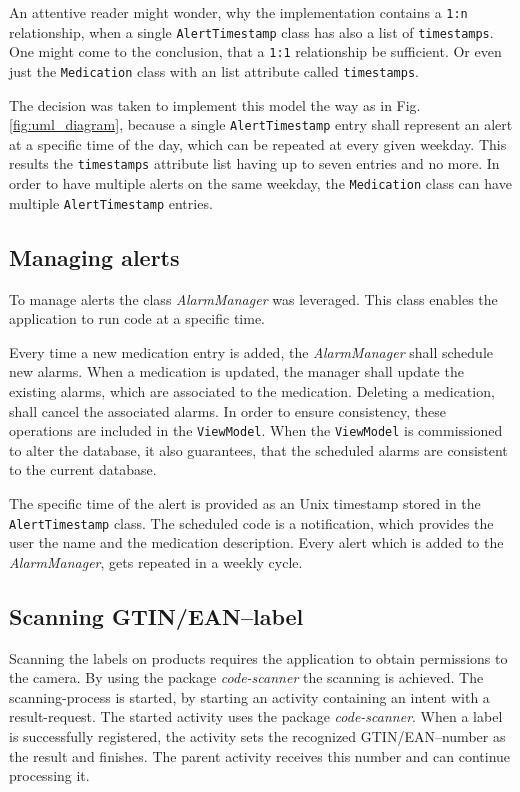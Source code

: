 \documentclass[conference]{IEEEtran}
\begin{document}
An attentive reader might wonder, why the implementation contains a \texttt{1:n} relationship, when a single
\texttt{AlertTimestamp} class has also a list of \texttt{timestamps}. One might come to the conclusion, that a
\texttt{1:1} relationship be sufficient. Or even just the \texttt{Medication} class with an list attribute called
\texttt{timestamps}.

The decision was taken to implement this model the way as in Fig. \ref{fig:uml_diagram}, because a single
\texttt{AlertTimestamp} entry shall represent an alert at a specific time of the day, which can be repeated
at every given weekday. This results the \texttt{timestamps} attribute list having up to seven entries and no
more. In order to have multiple alerts on the same weekday, the \texttt{Medication} class can have multiple 
\texttt{AlertTimestamp} entries.

\subsection{Managing alerts}
To manage alerts the class \textit{AlarmManager} \cite{alarmmanager} was leveraged. This class enables the
application to run code at a specific time.

Every time a new medication entry is added, the \textit{AlarmManager} shall schedule new alarms. When a
medication is updated, the manager shall update the existing alarms, which are associated to the
medication. Deleting a medication, shall cancel the associated alarms. In order to ensure consistency, these
operations are included in the \texttt{ViewModel}. When the \texttt{ViewModel} is commissioned to alter the 
database, it also guarantees, that the scheduled alarms are consistent to the current database.

The specific time of the alert is provided as an Unix timestamp stored in the \texttt{AlertTimestamp} class.
The scheduled code is a notification, which provides the user the name and the medication description.
Every alert which is added to the \textit{AlarmManager}, gets repeated in a weekly cycle.

\subsection{Scanning GTIN/EAN--label}
Scanning the labels on products requires the application to obtain permissions to the camera. By using the package
\textit{code-scanner} \cite{barcode} the scanning is achieved. The scanning-process is started, by 
starting an activity containing an intent with a result-request. The started activity uses the package
\textit{code-scanner}. When a label is successfully registered, the activity sets the recognized GTIN/EAN--number
as the result and finishes. The parent activity receives this number and can continue processing it.
\end{document}
